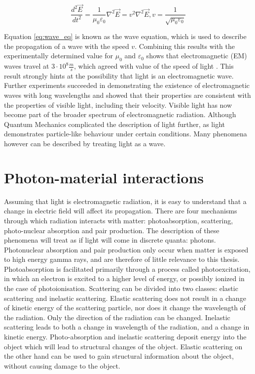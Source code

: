 \begin{equation}\label{eq:wave_eq}
\frac{d^2\vec{E}}{dt^2} = \frac{1}{\mu_0\varepsilon_0}\nabla^2 \vec{E} = v^2 \nabla^2 \vec{E},      v = \frac{1}{\sqrt{\mu_0\varepsilon_0}}
\end{equation}

Equation \ref{eq:wave_eq} is known as the wave equation, which is used to describe the propagation of a wave with the speed $v$. Combining this results with the experimentally determined value for $\mu_0$ and $\varepsilon_0$ shows that electromagnetic (EM) waves travel at \(3\cdot 10^8 \frac{m}{s}\), which agreed with value of the speed of light \cite{Froome1971}. This result strongly hints at the possibility that light is an electromagnetic wave. Further experiments succeeded in demonstrating the existence of electromagnetic waves with long wavelengths and showed that their properties are consistent with the properties of visible light, including their velocity. Visible light has now become part of the broader spectrum of electromagnetic radiation. Although Quantum Mechanics complicated the description of light further, as light demonstrates particle-like behaviour under certain conditions. Many phenomena however can be described by treating light as a wave. 

\section{Photon-material interactions}
Assuming that light is electromagnetic radiation, it is easy to understand that a change in electric field will affect its propagation. There are four mechanisms through which radiation interacts with matter: photoabsorption, scattering, photo-nuclear absorption and pair production. The description of these phenomena will treat as if light will come in discrete quanta: photons. 
Photonuclear absorption and pair production only occur when matter is exposed to high energy gamma rays, and are therefore of little relevance to this thesis. Photoabsorption is facilitated primarily through a process called photoexcitation, in which an electron is excited to a higher level of energy, or possibly ionized in the case of photoionisation. Scattering can be divided into two classes: elastic scattering and inelastic scattering. Elastic scattering does not result in a change of kinetic energy of the scattering particle, nor does it change the wavelength of the radiation. Only the direction of the radiation can be changed. Inelastic scattering leads to both a change in wavelength of the radiation, and a change in kinetic energy. Photo-absorption and inelastic scattering deposit energy into the object which will lead to structural changes of the object. Elastic scattering on the other hand can be used to gain structural information about the object, without causing damage to the object. 

